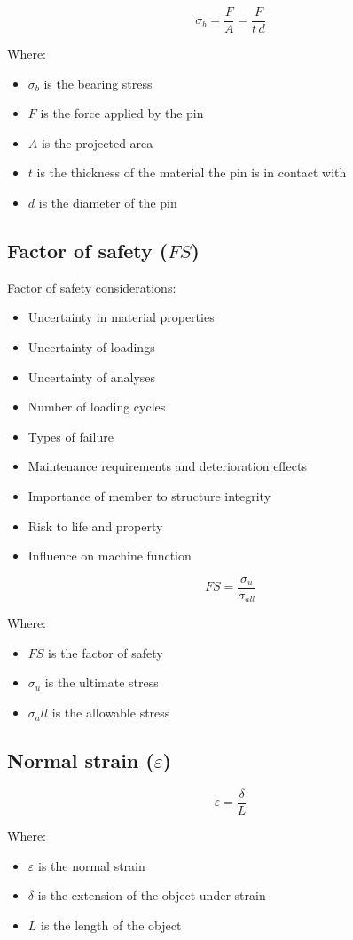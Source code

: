 \documentclass[11pt]{article}
\begin{document}
\[\sigma_b = \frac{F}{A} = \frac{F}{t \, d}\]

Where:
\begin{itemize}
\item \(\sigma_b\) is the bearing stress
\item \(F\) is the force applied by the pin
\item \(A\) is the projected area
\item \(t\) is the thickness of the material the pin is in contact with
\item \(d\) is the diameter of the pin
\end{itemize}

\newpage
\subsection{Factor of safety (\(FS\))}
\label{sec:org6ec277e}
Factor of safety considerations:
\begin{itemize}
\item Uncertainty in material properties
\item Uncertainty of loadings
\item Uncertainty of analyses
\item Number of loading cycles
\item Types of failure
\item Maintenance requirements and deterioration effects
\item Importance of member to structure integrity
\item Risk to life and property
\item Influence on machine function
\end{itemize}

\[FS = \frac{\sigma_u}{\sigma_{all}}\]

Where:
\begin{itemize}
\item \(FS\) is the factor of safety
\item \(\sigma_u\) is the ultimate stress
\item \(\sigma_all\) is the allowable stress
\end{itemize}
\subsection{Normal strain (\(\varepsilon\))}
\label{sec:org83e53a6}
\[\varepsilon = \frac{\delta}{L}\]

Where:
\begin{itemize}
\item \(\varepsilon\) is the normal strain
\item \(\delta\) is the extension of the object under strain
\item \(L\) is the length of the object
\end{itemize}
\end{document}
